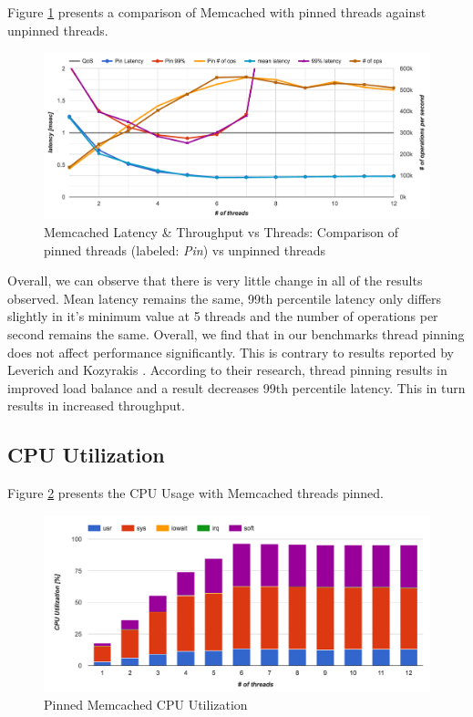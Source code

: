 Figure \ref{fig:m_pinning_latency} presents a comparison of Memcached with pinned threads against unpinned threads.

\begin{figure}[h]
    \includegraphics[width=\textwidth]{./res2/m_pinning_latency.png}
    \caption{Memcached Latency \& Throughput vs Threads: Comparison of pinned threads (labeled: \textit{Pin}) vs unpinned threads}
    \label{fig:m_pinning_latency}
\end{figure}

Overall, we can observe that there is very little change in all of the results observed. Mean latency remains the same, 99th percentile latency only differs slightly in it's minimum value at 5 threads and the number of operations per second remains the same. Overall, we find that in our benchmarks thread pinning does not affect performance significantly. This is contrary to results reported by Leverich and Kozyrakis \cite{leverich2014reconciling}. According to their research, thread pinning results in improved load balance and a result decreases 99th percentile latency. This in turn results in increased throughput.

\subsection{CPU Utilization}

Figure \ref{fig:m_pinning_cpu} presents the CPU Usage with Memcached threads pinned.

\begin{figure}[h]
    \includegraphics[width=\textwidth]{./res2/m_pinning_cpu.png}
    \caption{Pinned Memcached CPU Utilization}
    \label{fig:m_pinning_cpu}
\end{figure}

